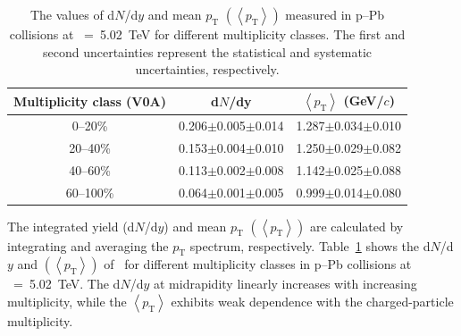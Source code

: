 \begin{table}[h!]
\caption{The values of d$N$/d$y$ and mean $p_{\mathrm{T}}$ $\left( \left\langle p_{\mathrm{T}} \right\rangle \right)$ measured in p--Pb collisions at \snn~=~5.02~TeV for different multiplicity classes. The first and second uncertainties represent the statistical and systematic uncertainties, respectively.}
\centering
\begin{tabular}{ccc}
\hline 
Multiplicity class (V0A) & d$N$/dy & $\left\langle p_{\mathrm{T}} \right\rangle$ (GeV/$c$) \\ \hline
0--20\% & 0.206$\pm$0.005$\pm$0.014 & 1.287$\pm$0.034$\pm$0.010 \\
20--40\% & 0.153$\pm$0.004$\pm$0.010 & 1.250$\pm$0.029$\pm$0.082 \\
40--60\% & 0.113$\pm$0.002$\pm$0.008 & 1.142$\pm$0.025$\pm$0.088 \\
60--100\% & 0.064$\pm$0.001$\pm$0.005 & 0.999$\pm$0.014$\pm$0.080 \\
\hline
\end{tabular}
\label{tab:ymp}
\end{table}

The integrated yield (d$N$/d$y$) and mean $p_{\mathrm{T}}$ $\left( \left\langle p_{\mathrm{T}} \right\rangle \right)$ are calculated by integrating and averaging the $p_{\mathrm{T}}$ spectrum, respectively. Table~\ref{tab:ymp} shows the d$N$/d$y$ and $\left( \left\langle p_{\mathrm{T}} \right\rangle \right)$ of \fzero~for different multiplicity classes in p--Pb collisions at \snn~=~5.02~TeV. The d$N$/d$y$ at midrapidity linearly increases with increasing multiplicity, while the $\left\langle p_{\mathrm{T}} \right\rangle$ exhibits weak dependence with the charged-particle multiplicity. 

